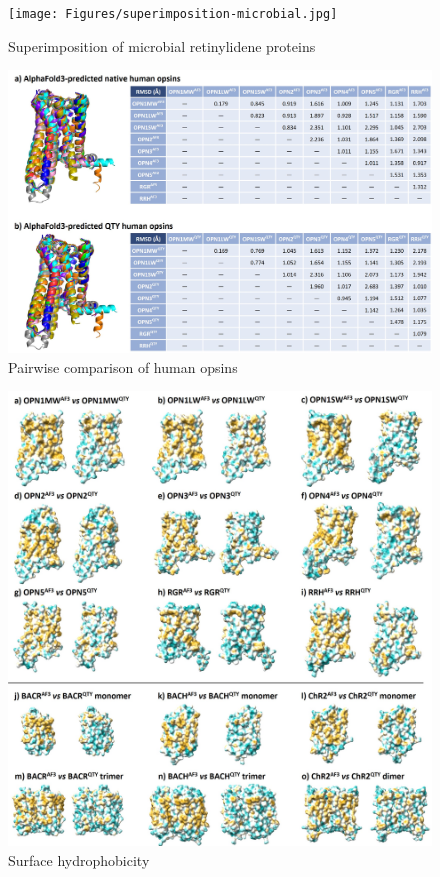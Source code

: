 \documentclass[fleqn,10pt,lineno]{manuscript}
\begin{document}
\begin{figure}[htbp]
	\centering
	\texttt{[image: Figures/superimposition-microbial.jpg]}
	\caption{Superimposition of microbial retinylidene proteins}
	\label{fig:microbialsup}
\end{figure}

\begin{figure}[htbp]
	\centering
	\includegraphics[width=\linewidth]{Figures/pairwise.jpg}
	\caption{Pairwise comparison of human opsins}
	\label{fig:pairwise}
\end{figure}

\begin{figure}[htbp]
	\centering
	\includegraphics[width=\linewidth]{Figures/hydrophobicity.jpg}
	\caption{Surface hydrophobicity}
	\label{fig:hydrophobicity}
\end{figure}
\end{document}

